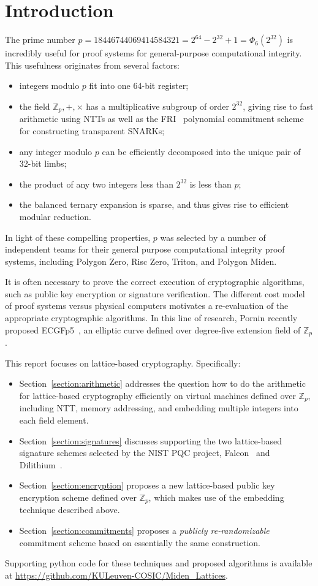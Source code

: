 \section{Introduction}

The prime number $p = 18446744069414584321 = 2^{64} - 2^{32} + 1 = \Phi_6(2^{32})$ is incredibly useful for proof systems for general-purpose computational integrity. This usefulness originates from several factors:
\begin{itemize}
 \item integers modulo $p$ fit into one 64-bit register;
 \item the field $\mathbb{Z}_p, +, \times$ has a multiplicative subgroup of order $2^{32}$, giving rise to fast arithmetic using NTTs as well as the FRI~\cite{fri} polynomial commitment scheme for constructing transparent SNARKs;
 \item any integer modulo $p$ can be efficiently decomposed into the unique pair of 32-bit limbs;
 \item the product of any two integers less than $2^{32}$ is less than $p$;
 \item the balanced ternary expansion is sparse, and thus gives rise to efficient modular reduction.
\end{itemize}
In light of these compelling properties, $p$ was selected by a number of independent teams for their general purpose computational integrity proof systems, including Polygon Zero, Risc Zero, Triton, and Polygon Miden.

It is often necessary to prove the correct execution of cryptographic algorithms, such as public key encryption or signature verification. The different cost model of proof systems versus physical computers motivates a re-evaluation of the appropriate cryptographic algorithms. In this line of research, Pornin recently proposed ECGFp5~\cite{ecgfp5}, an elliptic curve defined over degree-five extension field of $\mathbb{Z}_p$.

This report focuses on lattice-based cryptography. Specifically:
\begin{itemize}
\item Section~\ref{section:arithmetic} addresses the question how to do the arithmetic for lattice-based cryptography efficiently on virtual machines defined over $\mathbb{Z}_p$, including NTT, memory addressing, and embedding multiple integers into each field element.
\item Section~\ref{section:signatures} discusses supporting the two lattice-based signature schemes selected by the NIST PQC project, Falcon~\cite{falcon} and Dilithium~\cite{dilithium}.
\item Section~\ref{section:encryption} proposes a new lattice-based public key encryption scheme defined over $\mathbb{Z}_p$, which makes use of the embedding technique described above.
\item Section~\ref{section:commitments} proposes a \emph{publicly re-randomizable} commitment scheme based on essentially the same construction.
\end{itemize}
Supporting python code for these techniques and proposed algorithms is available at \url{https://github.com/KULeuven-COSIC/Miden_Lattices}.